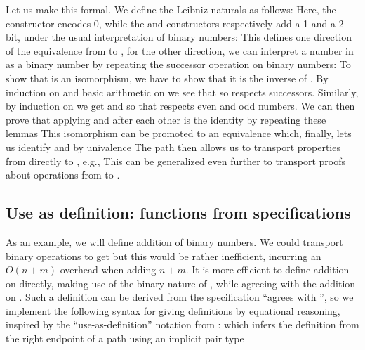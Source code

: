 Let us make this formal. We define the Leibniz naturals as follows:
Here, the  constructor encodes 0, while the  and  constructors respectively add a 1 and a 2 bit, under the usual interpretation of binary numbers:
This defines one direction of the equivalence from \bN{} to \bL{}, for the other direction, we can interpret a number in \bN{} as a binary number by repeating the successor operation on binary numbers:
To show that  is an isomorphism, we have to show that it is the inverse of . By induction on \bL{} and basic arithmetic on \bN{} we see that
so  respects successors. Similarly, by induction on \bN{} we get
and %
so that  respects even and odd numbers. We can then prove that applying  and  after each other is the identity by repeating these lemmas
This isomorphism can be promoted to an equivalence
which, finally, lets us identify \bN{} and \bL{} by univalence
The path  then allows us to transport properties from \bN{} directly to \bL{}, e.g.,
This can be generalized even further to transport proofs about operations from \bN{} to \bL{}. 

\subsection{Use as definition: functions from specifications}\label{ssec:useas}
As an example, we will define addition of binary numbers. We could transport binary operations
to get
but this would be rather inefficient, incurring an $O(n + m)$ overhead when adding $n + m$. It is more efficient to define addition on \bL{} directly, making use of the binary nature of \bL{}, while agreeing with the addition on \bN{}. Such a definition can be derived from the specification ``agrees with \AgdaFunction{\_+\_}'', so we implement the following syntax for giving definitions by equational reasoning, inspired by the ``use-as-definition'' notation from \cite{calcdata}:
which infers the definition from the right endpoint of a path using an implicit pair type

